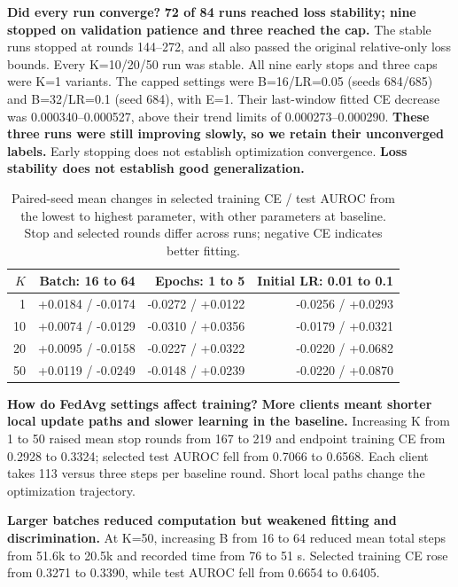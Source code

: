 \documentclass[10pt]{article}
\begin{document}
\begin{samepage}
\textbf{Did every run converge?} \textbf{72 of 84 runs reached loss stability; nine stopped on validation patience and three reached the cap.} The stable runs stopped at rounds 144--272, and all also passed the original relative-only loss bounds. Every K=10/20/50 run was stable. All nine early stops and three caps were K=1 variants. The capped settings were B=16/LR=0.05 (seeds 684/685) and B=32/LR=0.1 (seed 684), with E=1. Their last-window fitted CE decrease was 0.000340--0.000527, above their trend limits of 0.000273--0.000290. \textbf{These three runs were still improving slowly, so we retain their unconverged labels.} Early stopping does not establish optimization convergence.
\textbf{Loss stability does not establish good generalization.}\par
\end{samepage}

\begin{table}[ht]\centering\small
\caption{Paired-seed mean changes in selected training CE / test AUROC from the
lowest to highest parameter, with other parameters at baseline. Stop and
selected rounds differ across runs; negative CE indicates better fitting.}
\begin{tabular}{rrrr}\toprule
$K$ & Batch: 16 to 64 & Epochs: 1 to 5 & Initial LR: 0.01 to 0.1 \\
\midrule
1 & +0.0184 / -0.0174 & -0.0272 / +0.0122 & -0.0256 / +0.0293 \\
10 & +0.0074 / -0.0129 & -0.0310 / +0.0356 & -0.0179 / +0.0321 \\
20 & +0.0095 / -0.0158 & -0.0227 / +0.0322 & -0.0220 / +0.0682 \\
50 & +0.0119 / -0.0249 & -0.0148 / +0.0239 & -0.0220 / +0.0870 \\
\bottomrule\end{tabular}\end{table}
\textbf{How do FedAvg settings affect training?} \textbf{More clients meant shorter local update paths and slower learning in the baseline.} Increasing K from 1 to 50 raised mean stop rounds from 167 to 219 and endpoint training CE from 0.2928 to 0.3324; selected test AUROC fell from 0.7066 to 0.6568. Each client takes 113 versus three steps per baseline round. Short local paths change the optimization trajectory.

\textbf{Larger batches reduced computation but weakened fitting and discrimination.} At K=50, increasing B from 16 to 64 reduced mean total steps from 51.6k to 20.5k and recorded time from 76 to 51 s. Selected training CE rose from 0.3271 to 0.3390, while test AUROC fell from 0.6654 to 0.6405.
\end{document}
